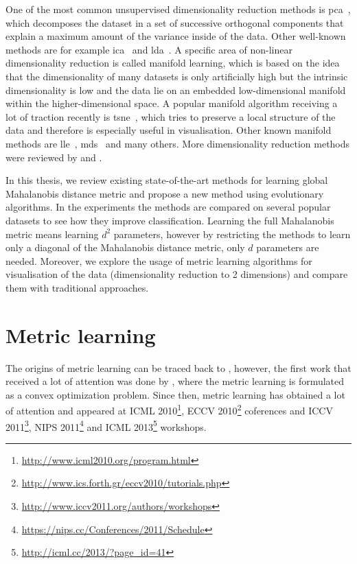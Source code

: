 \documentclass[12pt,a4paper]{report}
\begin{document}
One of the most common unsupervised dimensionality reduction methods is \ac{pca}~\citep{jolliffe2002principal}, which decomposes the dataset in a set of successive orthogonal components that explain a maximum amount of the variance inside of the data. Other well-known methods are for example \ac{ica}~\citep{comon1994independent} and \ac{lda}~\citep{fisher1936use}. A specific area of non-linear dimensionality reduction is called manifold learning, which is based on the idea that the dimensionality of many datasets is only artificially high but the intrinsic dimensionality is low and the data lie on an embedded low-dimensional manifold within the higher-dimensional space. A popular manifold algorithm receiving a lot of traction recently is \ac{tsne}~\citep{maaten2008visualizing}, which tries to preserve a local structure of the data and therefore is especially useful in visualisation. Other known manifold methods are \ac{lle}~\citep{roweis2000nonlinear}, \ac{mds}~\citep{kruskal1978multidimensional} and many others. More dimensionality reduction methods were reviewed by \citep{fodor2002survey} and \citep{van2009dimensionality}.

In this thesis, we review existing state-of-the-art methods for learning global Mahalanobis distance metric and propose a new method using evolutionary algorithms. In the experiments the methods are compared on several popular datasets to see how they improve classification. Learning the full Mahalanobis metric means learning $d^2$ parameters, however by restricting the methods to learn only a diagonal of the Mahalanobis distance metric, only $d$ parameters are needed. Moreover, we explore the usage of metric learning algorithms for visualisation of the data (dimensionality reduction to 2 dimensions) and compare them with traditional approaches.

\section{Metric learning} \label{chap:intro:ml}

The origins of metric learning can be traced back to \citep{short1981optimal}, however, the first work that received a lot of attention was done by \citep{xing2002distance}, where the metric learning is formulated as a convex optimization problem. Since then, metric learning has obtained a lot of attention and appeared at ICML 2010\footnote{\url{http://www.icml2010.org/program.html}}, ECCV 2010\footnote{\url{http://www.ics.forth.gr/eccv2010/tutorials.php}} coferences and ICCV 2011\footnote{\url{http://www.iccv2011.org/authors/workshops}}, NIPS 2011\footnote{\url{https://nips.cc/Conferences/2011/Schedule}} and ICML 2013\footnote{\url{http://icml.cc/2013/?page_id=41}} workshops.
\end{document}
